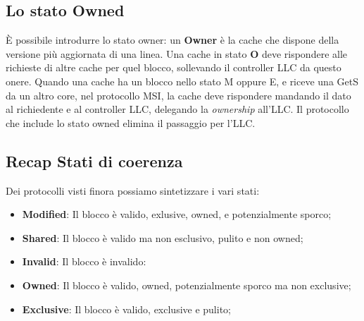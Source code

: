 \subsection{Lo stato Owned}
\uppercase{è} possibile introdurre lo stato owner: un \textbf{Owner} è la cache che dispone della versione più aggiornata di una linea. Una cache in stato \textbf{O} deve rispondere alle richieste di altre cache per quel blocco, sollevando il controller LLC da questo onere. Quando una cache ha un blocco nello stato M oppure E, e riceve una GetS da un altro core, nel protocollo MSI, la cache deve rispondere mandando il dato al richiedente e al controller LLC, delegando la \textit{ownership} all'LLC. Il protocollo che include lo stato owned elimina il passaggio per l'LLC.


\subsection{Recap Stati di coerenza}
Dei protocolli visti finora possiamo sintetizzare i vari stati:

\begin{itemize}
    \item \textbf{Modified}: Il blocco è valido, exlusive, owned, e potenzialmente sporco;
    \item \textbf{Shared}: Il blocco è valido ma non esclusivo, pulito e non owned;
    \item \textbf{Invalid}: Il blocco è invalido:
    \item \textbf{Owned}: Il blocco è valido, owned, potenzialmente sporco ma non exclusive;
    \item \textbf{Exclusive}: Il blocco è valido, exclusive e pulito;
\end{itemize}

\begin{figure}[ht]
    \centering
    \setlength{\fboxrule}{0.5pt} %
    \setlength{\fboxsep}{0pt}    %
\end{figure}

